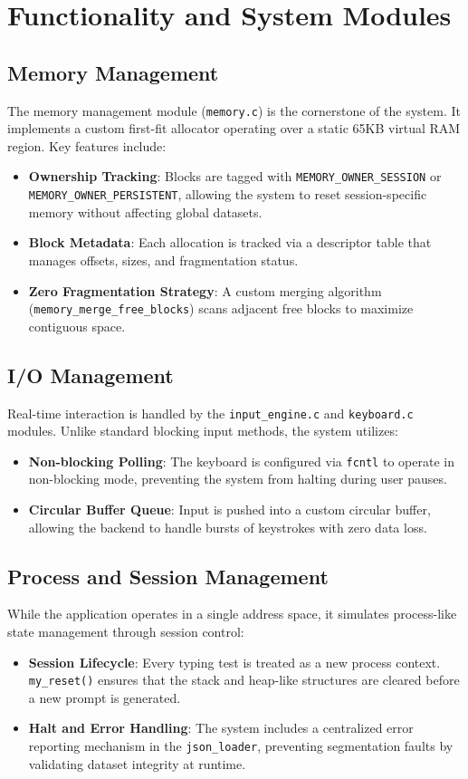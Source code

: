 \documentclass[conference]{IEEEtran}
\begin{document}
\section{Functionality and System Modules}

\subsection{Memory Management}
The memory management module (\texttt{memory.c}) is the cornerstone of the system. It implements a custom first-fit allocator operating over a static 65KB virtual RAM region. Key features include:
\begin{itemize}
    \item \textbf{Ownership Tracking}: Blocks are tagged with \texttt{MEMORY\_OWNER\_SESSION} or \texttt{MEMORY\_OWNER\_PERSISTENT}, allowing the system to reset session-specific memory without affecting global datasets.
    \item \textbf{Block Metadata}: Each allocation is tracked via a descriptor table that manages offsets, sizes, and fragmentation status.
    \item \textbf{Zero Fragmentation Strategy}: A custom merging algorithm (\texttt{memory\_merge\_free\_blocks}) scans adjacent free blocks to maximize contiguous space.
\end{itemize}

\subsection{I/O Management}
Real-time interaction is handled by the \texttt{input\_engine.c} and \texttt{keyboard.c} modules. Unlike standard blocking input methods, the system utilizes:
\begin{itemize}
    \item \textbf{Non-blocking Polling}: The keyboard is configured via \texttt{fcntl} to operate in non-blocking mode, preventing the system from halting during user pauses.
    \item \textbf{Circular Buffer Queue}: Input is pushed into a custom circular buffer, allowing the backend to handle bursts of keystrokes with zero data loss.
\end{itemize}

\subsection{Process and Session Management}
While the application operates in a single address space, it simulates process-like state management through session control:
\begin{itemize}
    \item \textbf{Session Lifecycle}: Every typing test is treated as a new process context. \texttt{my\_reset()} ensures that the stack and heap-like structures are cleared before a new prompt is generated.
    \item \textbf{Halt and Error Handling}: The system includes a centralized error reporting mechanism in the \texttt{json\_loader}, preventing segmentation faults by validating dataset integrity at runtime.
\end{itemize}
\end{document}

